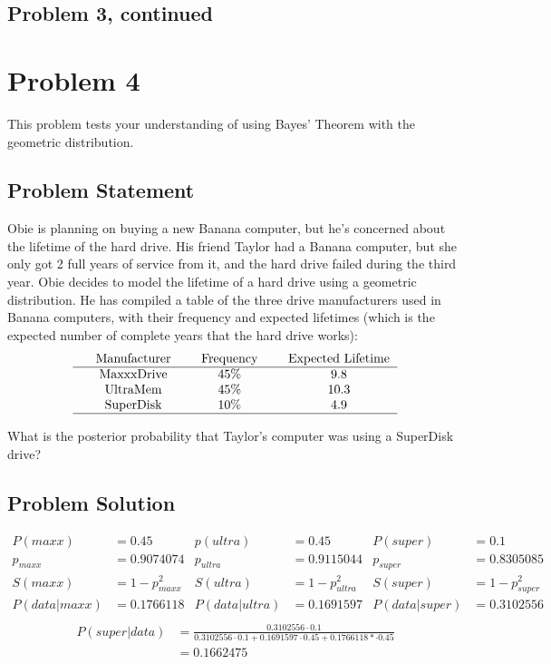 \documentclass[12pt]{article}
\theoremstyle{definition}
\begin{document}
\newpage
\subsection*{Problem 3, continued}





\newpage
\section*{Problem 4}

This problem tests your understanding of using Bayes' Theorem with the geometric distribution.


\subsection*{Problem Statement}

Obie is planning on buying a new Banana computer, but he's concerned about the lifetime of the hard drive. His friend Taylor had a Banana computer, but she only got 2 full years of service from it, and the hard drive failed during the third year. Obie decides to model the lifetime of a hard drive using a geometric distribution. He has compiled a table of the three drive manufacturers used in Banana computers, with their frequency and expected lifetimes (which is the expected number of complete years that the hard drive works):
$$
\begin{tabular}{ccccccc}
& Manufacturer & & Frequency & & Expected Lifetime\\
\hline
& MaxxxDrive & & 45\% & & 9.8\\
& UltraMem & & 45\% & & 10.3\\
& SuperDisk & & 10\% & & 4.9\\
\hline
\end{tabular}
$$

\bigskip
What is the posterior probability that Taylor's computer was using a SuperDisk drive?


\subsection*{Problem Solution}
\begin{align*}
P(maxx) &= 0.45 &p(ultra) &= 0.45 &P(super) &= 0.1\\
p_{maxx} &= 0.9074074 &p_{ultra} &= 0.9115044 &p_{super} &= 0.8305085\\
S(maxx) &= 1-p_{maxx}^2 &S(ultra) &= 1-p_{ultra}^2 &S(super) &= 1-p_{super}^2\\
P(data|maxx) &= 0.1766118 &P(data|ultra) &= 0.1691597 &P(data|super) &= 0.3102556\\
\end{align*}
\begin{align*}
P(super|data) &= \frac{0.3102556 \cdot 0.1}{0.3102556 \cdot 0.1 + 0.1691597 \cdot 0.45 + 0.1766118 *\cdot 0.45}\\
&= 0.1662475
\end{align*}
\end{document}
